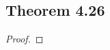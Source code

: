 \documentclass[../../main.tex]{subfiles}
\begin{document}
\subsection{Theorem 4.26}
\begin{wts}

\end{wts}
\begin{proof}

\end{proof}
\end{document}

